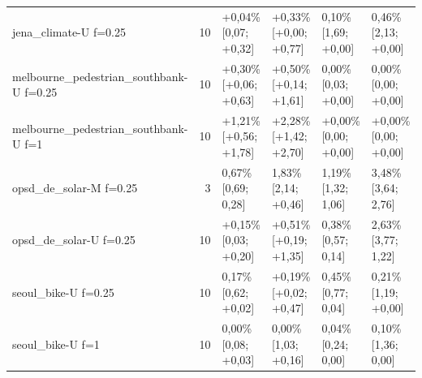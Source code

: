 \begin{table}[htbp]
\begin{tabular}{lrllll}
jena\_climate-U f=0.25 & 10 & +0,04\% [\textminus{}0,07; +0,32] & +0,33\% [+0,00; +0,77] & \textminus{}0,10\% [\textminus{}1,69; +0,00] & \textminus{}0,46\% [\textminus{}2,13; +0,00] \\
melbourne\_pedestrian\_southbank-U f=0.25 & 10 & +0,30\% [+0,06; +0,63] & +0,50\% [+0,14; +1,61] & \textminus{}0,00\% [\textminus{}0,03; +0,00] & \textminus{}0,00\% [\textminus{}0,00; +0,00] \\
melbourne\_pedestrian\_southbank-U f=1 & 10 & +1,21\% [+0,56; +1,78] & +2,28\% [+1,42; +2,70] & +0,00\% [\textminus{}0,00; +0,00] & +0,00\% [\textminus{}0,00; +0,00] \\
opsd\_de\_solar-M f=0.25 & 3 & \textminus{}0,67\% [\textminus{}0,69; \textminus{}0,28] & \textminus{}1,83\% [\textminus{}2,14; +0,46] & \textminus{}1,19\% [\textminus{}1,32; \textminus{}1,06] & \textminus{}3,48\% [\textminus{}3,64; \textminus{}2,76] \\
opsd\_de\_solar-U f=0.25 & 10 & +0,15\% [\textminus{}0,03; +0,20] & +0,51\% [+0,19; +1,35] & \textminus{}0,38\% [\textminus{}0,57; \textminus{}0,14] & \textminus{}2,63\% [\textminus{}3,77; \textminus{}1,22] \\
seoul\_bike-U f=0.25 & 10 & \textminus{}0,17\% [\textminus{}0,62; +0,02] & +0,19\% [+0,02; +0,47] & \textminus{}0,45\% [\textminus{}0,77; \textminus{}0,04] & \textminus{}0,21\% [\textminus{}1,19; +0,00] \\
seoul\_bike-U f=1 & 10 & \textminus{}0,00\% [\textminus{}0,08; +0,03] & \textminus{}0,00\% [\textminus{}1,03; +0,16] & \textminus{}0,04\% [\textminus{}0,24; \textminus{}0,00] & \textminus{}0,10\% [\textminus{}1,36; \textminus{}0,00] \\
\bottomrule
\end{tabular}
\par{}
\end{table}

